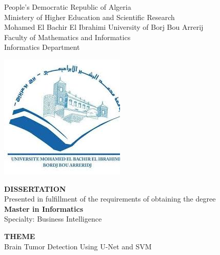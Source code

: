 
\thispagestyle{empty}
\begin{center}
  \begin{spacing}{1.15}
    People’s Democratic Republic of Algeria \\
    Ministery of Higher Education and Scientific Research \\
    Mohamed El Bachir El Ibrahimi University of Borj Bou Arrerij\\
    Faculty of Mathematics and Informatics\\
    Informatics Department\\
    \vspace{0.5cm}

    \includegraphics[scale=0.5]{Images/logo.jpeg}


    \fontsize{13}{15}\selectfont \textbf{DISSERTATION}\\
    Presented in fulfillment of the requirements of obtaining the degree\\
    \fontsize{13}{15}\selectfont \textbf{Master in Informatics} \\
    Specialty: Business Intelligence\\


    \vspace{1.5cm}

    \fontsize{19}{22}\selectfont \textbf{THEME} \\
    \fontsize{19}{22}\selectfont Brain Tumor Detection Using U-Net and SVM\\

  \end{spacing}
\end{center}

\vspace{0.5cm}

